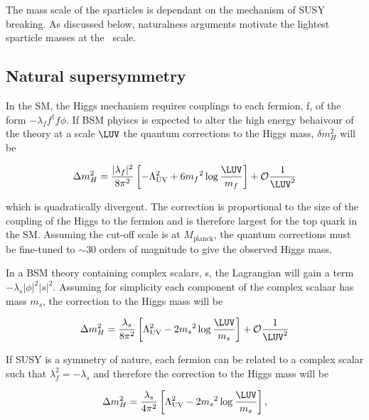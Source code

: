 The mass scale of the sparticles is dependant on the mechanism of SUSY breaking.
As discussed below, naturalness arguments motivate the lightest sparticle masses 
at the \TeV~scale.

\subsection{Natural supersymmetry}
\label{sec:natSUSY}
In the SM, the Higgs mechanism requires couplings to each fermion, f, of the form $-\lambda_{f}f^{\dagger}f\phi$. If BSM phyiscs
is expected to alter the high energy behaivour of the theory at a scale $\LUV$ the quantum corrections 
to the Higgs mass, $\delta m^2_{H}$ will be 

\begin{equation}
\Delta m^2_H =  \frac{|\lambda_f|^2}{8\pi^2}\left[-\Lambda^2_{\text{UV}} + 6 {m_f}^2\log\frac{\LUV}{m_f}\right] + \mathcal{O}\frac{1}{\LUV^2}
\end{equation}

which is quadratically divergent. The correction is proportional to the size of the coupling of the Higgs to the fermion 
and is therefore largest for the top quark in the SM. Assuming the cut-off scale is at $M_{\text{planck}}$, the quantum 
corrections must be fine-tuned to $\sim 30$ orders of magnitude to give the observed Higgs mass. 

In a BSM theory containing complex scalars, s, the Lagrangian will gain a term $-\lambda_{s}|\phi|^2|s|^2$.
Assuming for simplicity each component of the complex scalaar has mass $m_s$, the correction to the Higgs mass will be

\begin{equation}
\Delta m^2_H =  \frac{\lambda_s}{8\pi^2}\left[\Lambda^2_{\text{UV}} - 2 {m_s}^2\log\frac{\LUV}{m_s}\right] + \mathcal{O}\frac{1}{\LUV^2}
\end{equation}

If SUSY is a symmetry of nature, each fermion can be related to a complex scalar such that $\lambda_f^2 = -\lambda_s$ 
and therefore the correction to the Higgs mass will be 

\begin{equation}
\label{equ:corrHiggsSusy}
\Delta m^2_H =  \frac{\lambda_s}{4\pi^2}\left[\Lambda^2_{\text{UV}} - 2 {m_s}^2\log\frac{\LUV}{m_s}\right],
\end{equation}

